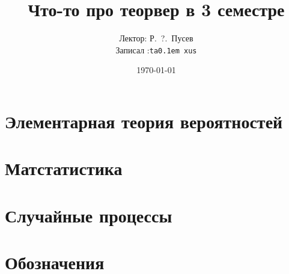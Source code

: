 \documentclass[12pt,timbord]{../notes}
\title{Что-то про теорвер в 3 семестре}
\date{\today}
\author{Лектор: Р.~?.~Пусев \\
Записал :\texttt{ta\lower 0.1em \hbox{x}us}}
\begin{document}
 
\maketitle
\tableofcontents
\clearpage

\chapter{Элементарная теория вероятностей}

\chapter{Матстатистика}

\chapter{Случайные процессы}


\clearpage

\appendix
\chapter{Обозначения}






\end{document}
